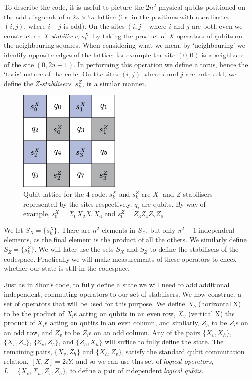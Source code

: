 To describe the code, it is useful to picture the $2n^2$ physical qubits positioned on the odd diagonals of a $2n \times 2n$ lattice (i.e. in the positions with coordinates $(i,j)$, where $i+j$ is odd). On the sites $(i, j)$ where $i$ and $j$ are both even we construct an \textit{X-stabiliser}, $s^X_{k}$, by taking the product of $X$ operators of qubits on the neighbouring squares. When considering what we mean by `neighbouring' we identify opposite edges of the lattice: for example the site $(0,0)$ is a neighbour of the site $(0, 2n-1)$. In performing this operation we define a torus, hence the `toric' nature of the code. On the sites $(i,j)$ where $i$ and $j$ are both odd, we define the \textit{Z-stabilisers}, $s^Z_{k}$, in a similar manner.
\begin{figure}[htb]
  \begin{center}
    \includegraphics[width=5cm]{assets/4-code.pdf}
  \end{center}
  \caption{Qubit lattice for the $4$-code. $s_{k}^X$ and $s_{k}^Z$ are $X$- and $Z$-stabilisers represented by the sites respectively. $q_i$ are qubits. By way of example, $s_{0}^X = X_0 X_2 X_1 X_6$ and $s_{0}^Z = Z_3 Z_4 Z_2 Z_0$.}
  \label{4-code}
\end{figure}

We let $S_X = \{s^X_{k}\}$. There are $n^2$ elements in $S_X$, but only $n^2-1$ independent elements, as the final element is the product of all the others. We similarly define $S_Z = \{s^Z_{k}\}$. We will later use the sets $S_X$ and $S_Z$ to define the stabilisers of the codespace. Practically we will make measurements of these operators to check whether our state is still in the codespace. 

Just as in Shor's code, to fully define a state we will need to add additional independent, commuting operators to our set of stabilisers. We now construct a set of operators that will be used for this purpose. We define $X_h$ (horizontal X) to be the product of $X_i$s acting on qubits in an even row, $X_v$ (vertical X) the product of $X_i$s acting on qubits in an even column, and similarly, $Z_h$ to be $Z_i$s on an odd row, and $Z_v$ to be $Z_i$s on an odd column. Any of the pairs $\{X_v, X_h\}$, $\{X_v, Z_v\}$, $\{Z_v, Z_h\}$, and $\{Z_h, X_h\}$ will suffice to fully define the state. The remaining pairs, $\{X_v, Z_h\}$ and $\{X_h, Z_v\}$, satisfy the standard qubit commutation relation, $[X, Z] = 2iY$, and so we can use this set of \textit{logical operators}, $L = \{X_v, X_h, Z_v , Z_h\}$, to define a pair of independent \textit{logical qubits}. 

